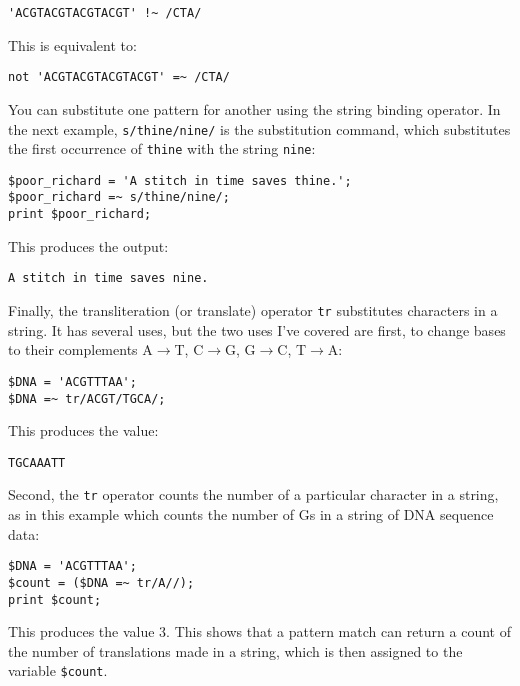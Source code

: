 \begin{lstlisting}
'ACGTACGTACGTACGT' !~ /CTA/
\end{lstlisting}

This is equivalent to:

\begin{lstlisting}
not 'ACGTACGTACGTACGT' =~ /CTA/
\end{lstlisting}

You can substitute one pattern for another using the string binding operator. In the next example, \verb|s/thine/nine/| is the substitution command, which substitutes the first occurrence of \verb|thine| with the string \verb|nine|:

\begin{lstlisting}
$poor_richard = 'A stitch in time saves thine.';
$poor_richard =~ s/thine/nine/;
print $poor_richard;
\end{lstlisting}

This produces the output:

\begin{lstlisting}
A stitch in time saves nine.
\end{lstlisting}

Finally, the transliteration (or translate) operator \verb|tr| substitutes characters in a string. It has several uses, but the two uses I've covered are first, to change bases to their complements A$\rightarrow$T, C$\rightarrow$G, G$\rightarrow$C, T$\rightarrow$A:

\begin{lstlisting}
$DNA = 'ACGTTTAA';
$DNA =~ tr/ACGT/TGCA/;
\end{lstlisting}

This produces the value:

\begin{lstlisting}
TGCAAATT
\end{lstlisting}

Second, the \verb|tr| operator counts the number of a particular character in a string, as in this example which counts the number of Gs in a string of DNA sequence data:

\begin{lstlisting}
$DNA = 'ACGTTTAA';
$count = ($DNA =~ tr/A//);
print $count;
\end{lstlisting}

This produces the value 3. This shows that a pattern match can return a count of the number of translations made in a string, which is then assigned to the variable \verb|$count|. 


